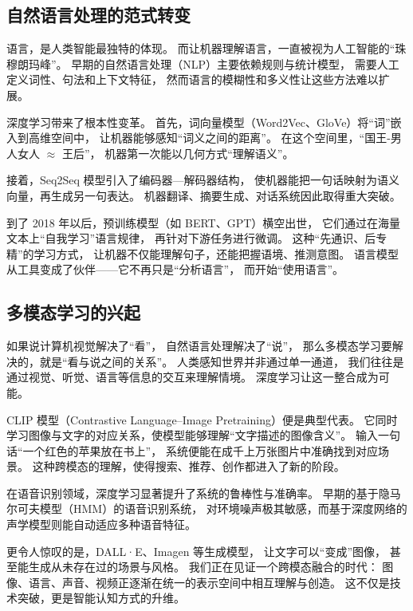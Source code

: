 \subsection{自然语言处理的范式转变}

语言，是人类智能最独特的体现。  
而让机器理解语言，一直被视为人工智能的“珠穆朗玛峰”。  
早期的自然语言处理（NLP）主要依赖规则与统计模型，  
需要人工定义词性、句法和上下文特征，  
然而语言的模糊性和多义性让这些方法难以扩展。  

深度学习带来了根本性变革。  
首先，词向量模型（Word2Vec、GloVe）将“词”嵌入到高维空间中，  
让机器能够感知“词义之间的距离”。  
在这个空间里，“国王-男人女人 $\approx$  王后”，  
机器第一次能以几何方式“理解语义”。  

接着，Seq2Seq 模型引入了编码器—解码器结构，  
使机器能把一句话映射为语义向量，再生成另一句表达。  
机器翻译、摘要生成、对话系统因此取得重大突破。  

到了 2018 年以后，预训练模型（如 BERT、GPT）横空出世，  
它们通过在海量文本上“自我学习”语言规律，  
再针对下游任务进行微调。  
这种“先通识、后专精”的学习方式，  
让机器不仅能理解句子，还能把握语境、推测意图。  
语言模型从工具变成了伙伴——它不再只是“分析语言”，  
而开始“使用语言”。


\subsection{多模态学习的兴起}

如果说计算机视觉解决了“看”，  
自然语言处理解决了“说”，  
那么多模态学习要解决的，就是“看与说之间的关系”。  
人类感知世界并非通过单一通道，  
我们往往是通过视觉、听觉、语言等信息的交互来理解情境。  
深度学习让这一整合成为可能。  

CLIP 模型（Contrastive Language–Image Pretraining）便是典型代表。  
它同时学习图像与文字的对应关系，使模型能够理解“文字描述的图像含义”。  
输入一句话“一个红色的苹果放在书上”，  
系统便能在成千上万张图片中准确找到对应场景。  
这种跨模态的理解，使得搜索、推荐、创作都进入了新的阶段。  

在语音识别领域，深度学习显著提升了系统的鲁棒性与准确率。  
早期的基于隐马尔可夫模型（HMM）的语音识别系统，  
对环境噪声极其敏感，而基于深度网络的声学模型则能自动适应多种语音特征。  

更令人惊叹的是，DALL·E、Imagen 等生成模型，  
让文字可以“变成”图像，  
甚至能生成从未存在过的场景与风格。  
我们正在见证一个跨模态融合的时代：  
图像、语言、声音、视频正逐渐在统一的表示空间中相互理解与创造。  
这不仅是技术突破，更是智能认知方式的升维。


